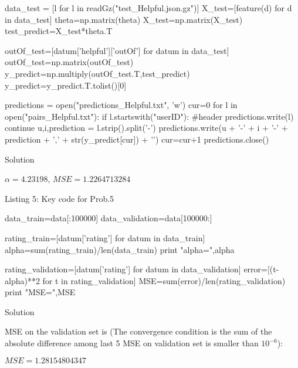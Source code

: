 \documentclass{assignment}
\begin{document}
\begin{problemlist}
\begin{python}
data_test = [l for l in readGz("test_Helpful.json.gz")]
X_test=[feature(d) for d in data_test]
theta=np.matrix(theta)
X_test=np.matrix(X_test)
test_predict=X_test*theta.T

outOf_test=[datum['helpful']['outOf'] for datum in data_test]
outOf_test=np.matrix(outOf_test)
y_predict=np.multiply(outOf_test.T,test_predict)
y_predict=y_predict.T.tolist()[0]

predictions = open("predictions_Helpful.txt", 'w')
cur=0
for l in open("pairs_Helpful.txt"):
  if l.startswith("userID"):
    #header
    predictions.write(l)
    continue
  u,i,prediction = l.strip().split('-')
  predictions.write(u + '-' + i + '-' + prediction + ',' + str(y_predict[cur]) + '\n')
  cur=cur+1
predictions.close()
\end{python}

\pbitem Solution

\begin{center} 
$\alpha=4.23198$, $MSE= 1.2264713284$
\end{center}

\begin{center} 
Listing 5: Key code for Prob.5
\end{center}
\begin{python}
data_train=data[:100000]
data_validation=data[100000:]

rating_train=[datum['rating'] for datum in data_train]
alpha=sum(rating_train)/len(data_train)
print "alpha=",alpha    

rating_validation=[datum['rating'] for datum in data_validation]
error=[(t-alpha)**2 for t in rating_validation]
MSE=sum(error)/len(rating_validation)
print "MSE=",MSE 
\end{python}

\pbitem Solution
\vspace{2ex}

MSE on the validation set is (The convergence condition is the sum of the absolute difference among last 5 MSE on validation set is smaller than $10^{-6}$):

\begin{center} 
$MSE=1.28154804347$
\end{center}


\end{problemlist}
\end{document}
